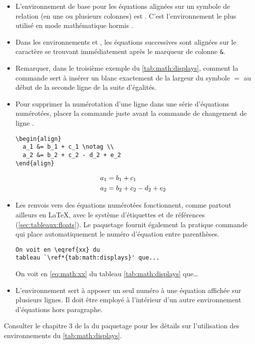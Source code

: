 \begin{itemize}
\item L'environnement de base pour les équations alignées sur un
  symbole de relation (en une ou plusieurs colonnes) est .
  C'est l'environnement le plus utilisé en mode mathématique hormis
  .
\item Dans les environnements  et , les équations
  successives sont alignées sur le caractère se trouvant immédiatement
  après le marqueur de colonne \verb=&=.
\item Remarquer, dans le troisième exemple du
  \autoref{tab:math:displays}, comment la commande \cmd{\phantom} sert
  à insérer un blanc exactement de la largeur du symbole $=$ au début
  de la seconde ligne de la suite d'égalités.
\item Pour supprimer la numérotation d'une ligne dans une série
  d'équations numérotées, placer la commande \cmd{\notag} juste avant
  la commande de changement de ligne {\bs\bs}.
  \begin{demo}
    \begin{texample}[0.53\linewidth]
\begin{lstlisting}
\begin{align}
  a_1 &= b_1 + c_1 \notag \\
  a_2 &= b_2 + c_2 - d_2 + e_2
\end{align}
\end{lstlisting}
      \producing
      \begin{align}
        a_1& =b_1+c_1 \notag \\
        a_2& =b_2+c_2-d_2+e_2
      \end{align}
    \end{texample}
  \end{demo}
\item Les renvois vers des équations numérotées fonctionnent, comme
  partout ailleurs en {\LaTeX}, avec le système d'étiquettes et de
  références (\autoref{sec:tableaux:floats}). Le paquetage
   fournit également la pratique commande \cmd{\eqref}
  qui place automatiquement le numéro d'équation entre parenthèses.
  \begin{demo}
    \begin{texample}
\begin{lstlisting}
On voit en \eqref{xx} du
tableau `\ref*{tab:math:displays}' que...
\end{lstlisting}
      \producing
      On voit en \eqref{eq:math:xx} du tableau
      \ref*{tab:math:displays} que\dots
    \end{texample}
  \end{demo}
\item L'environnement  sert à apposer un seul numéro à une
  équation affichée sur plusieurs lignes. Il doit être employé à
  l'intérieur d'un autre environnement d'équations hors paragraphe.
\end{itemize}
Consulter le chapitre 3 de la %
du paquetage  pour les détails sur
l'utilisation des environnements du \autoref*{tab:math:displays}.

